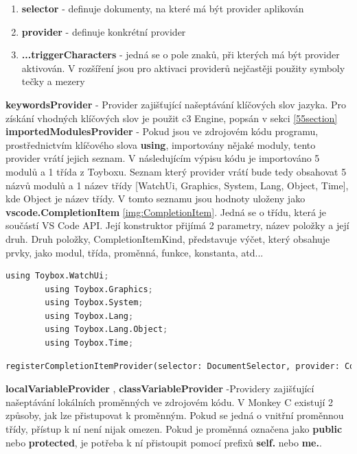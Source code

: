 \begin{enumerate}
\item \textbf{selector} - definuje dokumenty, na které má být provider aplikován
\item \textbf{provider} - definuje konkrétní provider
\item \textbf{...triggerCharacters} - jedná se o pole znaků, při kterých má být provider aktivován. V rozšíření jsou pro aktivaci providerů nejčastěji použity symboly tečky a mezery
\end{enumerate}

\textbf{keywordsProvider} - Provider zajišťující našeptávání klíčových slov jazyka. Pro získání vhodných klíčových slov je použit c3 Engine, popsán v sekci \ref{55section}\\

\textbf{importedModulesProvider} - Pokud jsou ve zdrojovém kódu programu, prostřednictvím klíčového slova \textbf{using}, importovány nějaké moduly, tento provider vrátí jejich seznam. V následujícím výpisu kódu je importováno 5 modulů a 1 třída z Toyboxu. Seznam který provider vrátí bude tedy obsahovat 5 názvů modulů a 1 název třídy [WatchUi, Graphics, System, Lang, Object, Time], kde Object je název třídy. V tomto seznamu jsou hodnoty uloženy jako \textbf{vscode.CompletionItem} \ref{img:CompletionItem}. Jedná se o třídu, která je součástí VS Code API. Její konstruktor přijímá 2 parametry, název položky a její druh. Druh položky, CompletionItemKind, představuje výčet, který obsahuje prvky, jako modul, třída, proměnná, funkce, konstanta, atd...\\


\begin{lstlisting}[language=Python,label=src:usingStatements,caption={importované moduly z Toyboxu}]
      using Toybox.WatchUi;
		using Toybox.Graphics;
		using Toybox.System;
		using Toybox.Lang;
		using Toybox.Lang.Object;
		using Toybox.Time;
\end{lstlisting}



\begin{lstlisting}[language=Python,label=src:completionProvider,caption={aktivační události rozšíření}]
        registerCompletionItemProvider(selector: DocumentSelector, provider: CompletionItemProvider, ...triggerCharacters: string[]): Disposable
\end{lstlisting}

\textbf{localVariableProvider} , \textbf{classVariableProvider} -Providery zajišťující našeptávání lokálních proměnných ve zdrojovém kódu. V Monkey C existují 2 způsoby, jak lze přistupovat k proměnným. Pokud se jedná o vnitřní proměnnou třídy, přístup k ní není nijak omezen. Pokud je proměnná označena jako \textbf{public} nebo \textbf{protected}, je potřeba k ní přistoupit pomocí prefixů \textbf{self.} nebo \textbf{me.}.\\

